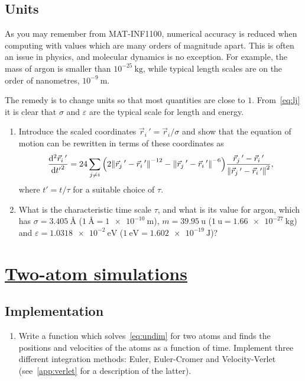 \documentclass[11pt,british,a4paper]{report}
\begin{document}
\subsection{Units}
As you may remember from MAT-INF1100, numerical accuracy is reduced when computing with values which are many orders of magnitude apart. This is often an issue in physics, and molecular dynamics is no exception. For example, the mass of argon is smaller than \(10^{-25}\ \si{\kg}\), while typical length scales are on the order of nanometres, \(10^{-9}\ \si{\m}\).

The remedy is to change units so that most quantities are close to \(1\). From~\vref{eq:lj} it is clear that \(\sigma\) and \(\varepsilon\) are the typical scale for length and energy.

\begin{enumerate}[label=\roman*.]
    \item Introduce the scaled coordinates \(\vec{r}_i\,'=\vec{r}_i/\sigma\) and show that the equation of motion can be rewritten in terms of these coordinates as
    \begin{equation}
        \dv[2]{\vec{r}_i\,'}{{t'}} = 24 \sum_{j \neq i} \qty(2\norm{\vec{r}_j\,'-\vec{r}_i\,'}^{-12}-\norm{\vec{r}_j\,'-\vec{r}_i\,'}^{-6})\frac{\vec{r}_j\,'-\vec{r}_i\,'}{\norm{\vec{r}_j\,'-\vec{r}_i\,'}^2},\label{eq:undim}
    \end{equation}
    where \(t'=t/\tau\) for a suitable choice of \(\tau\).
    \item What is the characteristic time scale \(\tau\), and what is its value for argon, which has \(\sigma=\SI{3.405}{\angstrom}\) (\(\SI{1}{\angstrom}=\SI{1e-10}{\m}\)), \(m = \SI{39.95}{\atomicmassunit}\) (\(\SI{1}{\atomicmassunit} = \SI{1.66e-27}{\kg}\)) and \(\varepsilon=\SI{1.0318e-2}{\eV}\) (\(\SI{1}{\eV}=\SI{1.602e-19}{\J}\))?
\end{enumerate}



\section{\underline{Two-atom simulations}}

\subsection{Implementation}
\begin{enumerate}[label=\roman*.]
    \item Write a function which solves~\vref{eq:undim} for two atoms and finds the positions and velocities of the atoms as a function of time. Implement three different integration methods:
        Euler, Euler-Cromer and Velocity-Verlet (see~\vref{app:verlet} for a description of the latter).
\end{enumerate}
\end{document}
